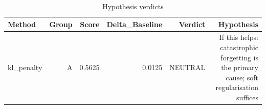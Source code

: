 \begin{table}[htbp]
\centering
\caption{Hypothesis verdicts}
\label{tab:hyp-verdicts}
\begin{tabular}{lrrrrr}
\toprule
\textbf{Method} & \textbf{Group} & \textbf{Score} & \textbf{Delta\_Baseline} & \textbf{Verdict} & \textbf{Hypothesis} \\
\midrule
kl\_penalty & A & 0.5625 & 0.0125 & NEUTRAL & If this helps: catastrophic forgetting is the primary cause; soft regularisation suffices \\
\bottomrule
\end{tabular}
\end{table}